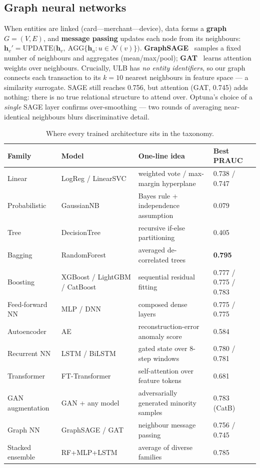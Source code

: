 \documentclass[11pt,a4paper]{article}
\newcommand{\term}[1]{\textbf{\textcolor{accent}{#1}}}
\begin{document}
\subsection{Graph neural networks}
When entities are linked (card---merchant---device), data forms a \term{graph}
$G=(V,E)$, and \term{message passing} updates each node from its neighbours:
$\mathbf{h}_v' = \mathrm{UPDATE}\big(\mathbf{h}_v,\ \mathrm{AGG}\{\mathbf{h}_u : u \in \mathcal{N}(v)\}\big)$.
\textbf{GraphSAGE}~\cite{hamilton2017} samples a fixed number of neighbours and aggregates
(mean/max/pool); \textbf{GAT}~\cite{velickovic2018} learns attention weights over neighbours.
Crucially, ULB has \emph{no entity identifiers}, so our graph connects each transaction to its
$k{=}10$ nearest neighbours in feature space --- a similarity surrogate. SAGE still reaches
0.756, but attention (GAT, 0.745) adds nothing: there is no true relational structure to attend
over. Optuna's choice of a \emph{single} SAGE layer confirms over-smoothing --- two rounds of
averaging near-identical neighbours blurs discriminative detail.

\begin{table}[h]
      \centering\small
      \caption{Where every trained architecture sits in the taxonomy.}
      \label{tab:families}
      \begin{tabularx}{\textwidth}{llXl}
            \toprule
            \textbf{Family} & \textbf{Model} & \textbf{One-line idea} & \textbf{Best PRAUC}\\
            \midrule
            Linear & LogReg / LinearSVC & weighted vote / max-margin hyperplane & 0.738 / 0.747\\
            Probabilistic & GaussianNB & Bayes rule + independence assumption & 0.079\\
            Tree & DecisionTree & recursive if-else partitioning & 0.405\\
            Bagging & RandomForest & averaged de-correlated trees & \textbf{0.795}\\
            Boosting & XGBoost / LightGBM / CatBoost & sequential residual fitting & 0.777 / 0.775 / 0.783\\
            Feed-forward NN & MLP / DNN & composed dense layers & 0.775 / 0.775\\
            Autoencoder & AE & reconstruction-error anomaly score & 0.584\\
            Recurrent NN & LSTM / BiLSTM & gated state over 8-step windows & 0.780 / 0.781\\
            Transformer & FT-Transformer & self-attention over feature tokens & 0.681\\
            GAN augmentation & GAN + any model & adversarially generated minority samples & 0.783 (CatB)\\
            Graph NN & GraphSAGE / GAT & neighbour message passing & 0.756 / 0.745\\
            Stacked ensemble & RF+MLP+LSTM & average of diverse families & 0.785\\
            \bottomrule
      \end{tabularx}
\end{table}
\end{document}
